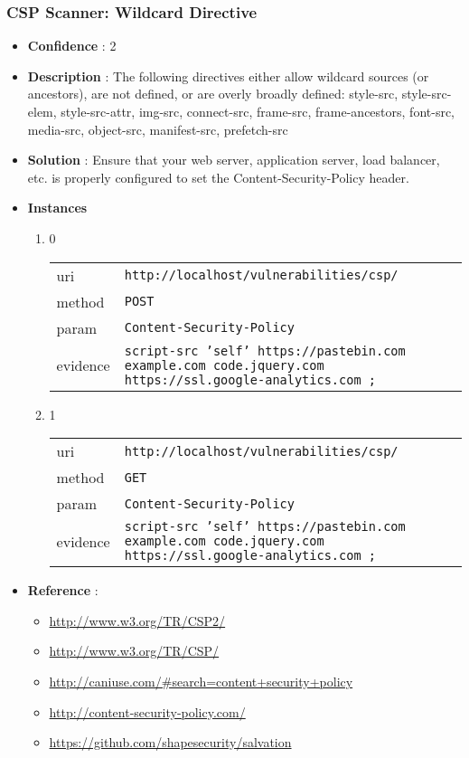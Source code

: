 \documentclass[10pt]{article}
\begin{document}
\subsubsection{CSP Scanner: Wildcard Directive}
\begin{itemize}
\item[] \textbf{Confidence} : 2
\item[] \textbf{Description} : The following directives either allow wildcard sources (or ancestors), are not defined, or are overly broadly defined: style-src, style-src-elem, style-src-attr, img-src, connect-src, frame-src, frame-ancestors, font-src, media-src, object-src, manifest-src, prefetch-src
\item[] \textbf{Solution} :  Ensure that your web server, application server, load balancer, etc. is properly configured to set the Content-Security-Policy header.
\item[] \textbf{Instances}
\begin{enumerate}
\item[] 0
\begin{tabular}{| l | p{12cm}}
uri & \texttt{http://localhost/vulnerabilities/csp/} \\
method & \texttt{POST} \\
param & \texttt{Content-Security-Policy} \\
evidence & \texttt{script-src 'self' https://pastebin.com  example.com code.jquery.com https://ssl.google-analytics.com ;} \\
\end{tabular}
\item[] 1
\begin{tabular}{| l | p{12cm}}
uri & \texttt{http://localhost/vulnerabilities/csp/} \\
method & \texttt{GET} \\
param & \texttt{Content-Security-Policy} \\
evidence & \texttt{script-src 'self' https://pastebin.com  example.com code.jquery.com https://ssl.google-analytics.com ;} \\
\end{tabular}
\end{enumerate}
\item[] \textbf{Reference} : 
\begin{itemize}
\item \url{http://www.w3.org/TR/CSP2/}
\item \url{http://www.w3.org/TR/CSP/}
\item \url{http://caniuse.com/\#search=content+security+policy}
\item \url{http://content-security-policy.com/}
\item \url{https://github.com/shapesecurity/salvation}
\end{itemize}
\end{itemize}
\end{document}
